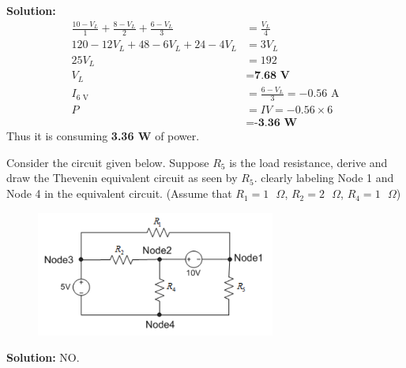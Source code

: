 \documentclass[a4paper, 12pt, addpoints]{exam}
\begin{document}
\begin{questions}
\begin{tcolorbox}
    \textbf{Solution:}
    \begin{align*}
        \frac{10-V_L}{1} + \frac{8-V_L}{2} + \frac{6-V_L}{3} &= \frac{V_L}{4} \\
        120 - 12V_L + 48 - 6V_L + 24 - 4V_L &= 3V_L \\
        25 V_L &= 192 \\
        V_L &= \textbf{7.68 V} \\
        I_{6\text{ V}} &= \frac{6-V_L}{3} = -0.56\text{ A}\\
        P &= IV = -0.56 \times 6 \\
        &= \textbf{-3.36 W}
    \end{align*}
    Thus it is consuming \textbf{3.36 W} of power.
\end{tcolorbox}

\question Consider the circuit given below. Suppose $R_5$ is the load resistance, derive and draw the Thevenin equivalent circuit as seen by $R_5$. clearly labeling Node 1 and Node 4 in the equivalent circuit.
(Assume that $R_1 = 1\text{ }\Omega$, $R_2 = 2\text{ }\Omega$, $R_4 = 1\text{ }\Omega$)
\begin{figure}[h!]
    \centering
    \includegraphics[width=0.7\textwidth]{images/Q12.png}
\end{figure}

\begin{tcolorbox}
    \textbf{Solution:} NO.
\end{tcolorbox}


\end{questions}
\end{document}
